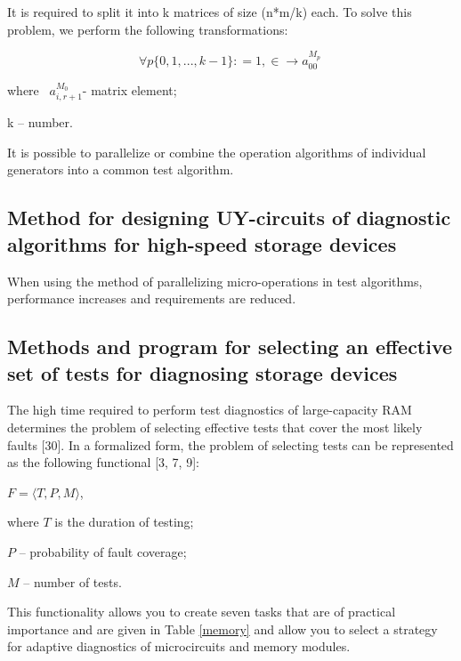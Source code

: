 \documentclass[12pt]{article}
\begin{document}
\noindent
It is required to split it into k matrices of size (n*m/k) each. To solve this problem, we perform the following transformations:

\vspace{-15pt}
{\centering
 \[\forall p \{ 0,1,...,k - 1\} : = 1 ,\in\rightarrow a_{00}^{M_p}\
\]}   

\noindent where \  $a_{i,r+1}^{M_0}${}- matrix element;

k – number.

It is possible to parallelize or combine the operation algorithms of individual generators into a common test algorithm.

\subsection{Method for designing UY-circuits of diagnostic algorithms for high-speed storage devices}\newpage

When using the method of parallelizing micro-operations in test algorithms, performance increases and requirements are reduced.

\subsection{Methods and program for selecting an effective set of tests for diagnosing storage devices}

The high time required to perform test diagnostics of large-capacity RAM determines the problem of selecting effective
tests that cover the most likely faults [30]. In a formalized form, the problem of selecting tests can be represented
as the following functional [3, 7, 9]:

\vspace{4pt}
{\centering
$F = {\langle} T, P, M{\rangle} $,
\par}

where $T$ is the duration of testing; 

$P$ – probability of fault coverage; 

$M$ – number of tests.

{
This functionality allows you to create seven tasks that are of practical importance and are given in Table \ref{memory} and
allow you to select a strategy for adaptive diagnostics of microcircuits and memory modules. }
\end{document}
